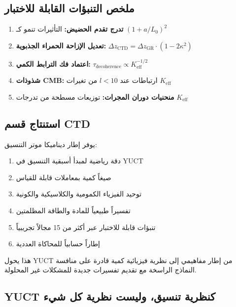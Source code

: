 \documentclass[11pt,a4paper]{article}
\begin{document}
	\subsection{ملخص التنبؤات القابلة للاختبار}
	\begin{enumerate}
		\item \textbf{تدرج تقدم الحضيض:} التأثيرات تنمو كـ $(1 + a/L_0)^2$
		\item \textbf{تعديل الإزاحة الحمراء الجذبوية:} $\Delta z_{\mathrm{CTD}} = \Delta z_{\mathrm{GR}} \cdot (1 - 2\kappa^2)$
		\item \textbf{اعتماد فك الترابط الكمي:} $\tau_{\mathrm{decoherence}} \propto K_{\mathrm{eff}}^{-1/2}$
		\item \textbf{شذوذات CMB:} ارتباطات عند $l < 10$ من تغيرات $K_{\mathrm{eff}}$
		\item \textbf{منحنيات دوران المجرات:} توزيعات مسطحة من تدرجات $K_{\mathrm{eff}}$
	\end{enumerate}
	
	\subsection{استنتاج قسم CTD}
	يوفر إطار ديناميكا موتر التنسيق:
	\begin{enumerate}
		\item دقة رياضية لمبدأ أسبقية التنسيق في YUCT
		\item صيغاً كمية بمعاملات قابلة للقياس
		\item توحيد الفيزياء الكمومية والكلاسيكية والكونية
		\item تفسيراً طبيعياً للمادة والطاقة المظلمتين
		\item تنبؤات قابلة للاختبار عبر أكثر من 15 مجالاً تجريبياً
		\item إطاراً حسابياً للمحاكاة العددية
	\end{enumerate}
	هذا يحول YUCT من إطار مفاهيمي إلى نظرية فيزيائية كمية قادرة على منافسة النماذج الراسخة مع تقديم تفسيرات جديدة للمشكلات غير المحلولة.
	
	\subsection{YUCT كنظرية تنسيق، وليست نظرية كل شيء}
	\label{subsec:not-toe}
	
\end{document}
